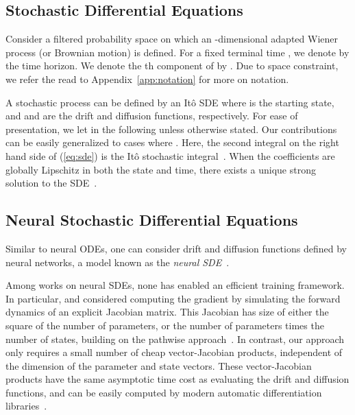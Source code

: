 \documentclass[twoside]{article}
\begin{document}
\subsection{Stochastic Differential Equations}

Consider a filtered probability space  on which an -dimensional adapted Wiener process (or Brownian motion)  is defined. 
For a fixed terminal time , we denote by  the time horizon.
We denote the th component of  by . 
Due to space constraint, we refer the read to Appendix~\ref{app:notation} for more on notation. 

A stochastic process  can be defined by an It\^o SDE
where  is the starting state,
and  and  are the drift and diffusion functions, respectively. 
For ease of presentation, we let  in the following unless otherwise stated. Our contributions can be easily generalized to cases where .
Here, the second integral on the right hand side of (\ref{eq:sde}) is the It\^{o} stochastic integral~\cite{oksendal2003stochastic}. When the coefficients are globally Lipschitz in both the state and time, there exists a unique strong solution to the SDE~\cite{oksendal2003stochastic}. 

\subsection{Neural Stochastic Differential Equations}
\label{subsec:bg_neural_sde}
Similar to neural ODEs, one can consider drift and diffusion functions defined by neural networks, a model known as the \textit{neural SDE}~\citep{tzen2019neural,tzen2019theoretical,liu2019neural,jia2019}.

Among works on neural SDEs, none has enabled an efficient training framework.
In particular, \citet{tzen2019neural} and \citet{liu2019neural} considered computing the gradient by simulating the forward dynamics of an explicit Jacobian matrix.
This Jacobian has size of either the square of the number of parameters, or the number of parameters times the number of states, building on the pathwise approach~\cite{gobet2005sensitivity,yang1991monte}.
In contrast, our approach only requires a small number of cheap vector-Jacobian products, independent of the dimension of the parameter and state vectors.
These vector-Jacobian products have the same asymptotic time cost as evaluating the drift and diffusion functions, and can be easily computed by modern automatic differentiation libraries~\citep{maclaurin2015autograd,paszke2017automatic,abadi2016tensorflow,frostig2018compiling}. 
\end{document}
